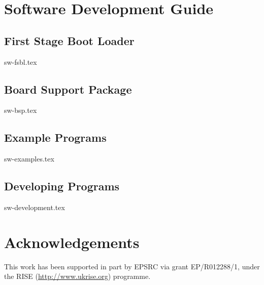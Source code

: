 \documentclass{scarv-report}
\begin{document}
\section{Software Development Guide}
\label{sec:sw-development}

\subsection{First Stage Boot Loader}
{sw-fsbl.tex}

\subsection{Board Support Package}
{sw-bsp.tex}

\subsection{Example Programs}
{sw-examples.tex}

\subsection{Developing Programs}
{sw-development.tex}

\section{Acknowledgements}

This work has been supported in part by EPSRC via grant EP/R012288/1,
under the RISE (\url{http://www.ukrise.org}) programme.


\MKEPILOGUE

\end{document}
